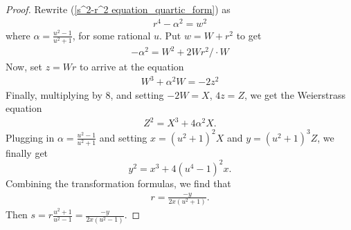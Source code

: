 \documentclass[10pt,a4paper]{amsart}
\begin{document}
\begin{proof} Rewrite (\ref{s^2-r^2 equation_quartic_form}) as
\begin{align*}
    r^4-\alpha^2 = w^2
\end{align*}
where $\alpha = \frac{u^2-1}{u^2+1}$, for some rational $u$. Put $w = W + r^2$ to get
\begin{align*}
    -\alpha^2 = W^2+2Wr^2\Big /\cdot W
\end{align*}
Now, set $z = Wr$ to arrive at the equation
\begin{align*}
    W^3+\alpha^2W = -2z^2
\end{align*}
Finally, multiplying by $8$, and setting $-2W = X$, $4z=Z$, we get the Weierstrass equation
\begin{align*}
    Z^2 =  X^3+4\alpha^2 X.
\end{align*}
Plugging in $\alpha=\frac{u^2-1}{u^2+1}$ and setting $x = (u^2+1)^2 X$ and $y = (u^2+1)^3Z$, we finally get \[y^2=x^3+4(u^4-1)^2x.\]
Combining the transformation formulas, we find that
\begin{align*}
    r = \frac{-y}{2x(u^2+1)}. 
\end{align*}
Then $s=r \frac{u^2+1}{u^2-1} = \frac{-y}{2x(u^2-1)}$. 
\end{proof}
\end{document}
